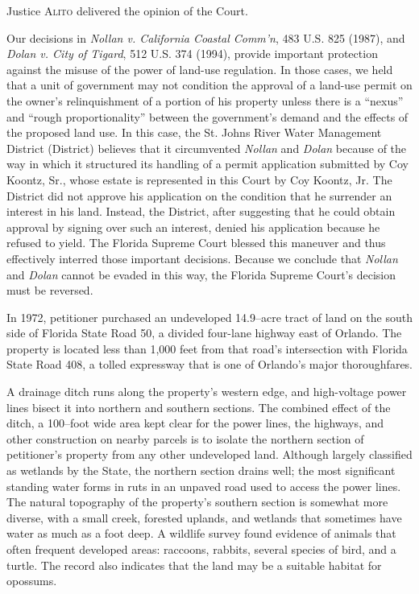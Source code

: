 

\opinion Justice \textsc{Alito} delivered the opinion of the Court.

Our decisions in \textit{Nollan v. California Coastal Comm'n}, 483 U.S.
825 (1987), and \textit{Dolan v. City of Tigard}, 512 U.S. 374 (1994), provide
important protection against the misuse of the power of land-use regulation. In
those cases, we held that a unit of government may not condition the approval of
a land-use permit on the owner's relinquishment of a portion of his property
unless there is a ``nexus'' and ``rough proportionality'' between the
government's demand and the effects of the proposed land use. In this case, the
St. Johns River Water Management District (District) believes that it
circumvented \textit{Nollan} and \textit{Dolan} because of the way in which it
structured its handling of a permit application submitted by Coy Koontz, Sr.,
whose estate is represented in this Court by Coy Koontz, Jr. The District did
not approve his application on the condition that he surrender an interest in
his land. Instead, the District, after suggesting that he could obtain approval
by signing over such an interest, denied his application because he refused to
yield. The Florida Supreme Court blessed this maneuver and thus effectively
interred those important decisions. Because we conclude that \textit{Nollan} and
\textit{Dolan} cannot be evaded in this way, the Florida Supreme Court's
decision must be reversed. 





In 1972, petitioner purchased an undeveloped 14.9--acre tract of land on the
south side of Florida State Road 50, a divided four-lane highway east of
Orlando. The property is located less than 1,000 feet from that road's
intersection with Florida State Road 408, a tolled expressway that is one of
Orlando's major thoroughfares.

A drainage ditch runs along the property's western edge, and high-voltage power
lines bisect it into northern and southern sections. The combined effect of the
ditch, a 100--foot wide area kept clear for the power lines, the highways, and
other construction on nearby parcels is to isolate the northern section of
petitioner's property from any other undeveloped land. Although largely
classified as wetlands by the State, the northern section drains well; the most
significant standing water forms in ruts in an unpaved road used to access the
power lines. The natural topography of the property's southern section is
somewhat more diverse, with a small creek, forested uplands, and wetlands that
sometimes have water as much as a foot deep. A wildlife survey found evidence of
animals that often frequent developed areas: raccoons, rabbits, several species
of bird, and a turtle. The record also indicates that the land may be a suitable
habitat for opossums.

